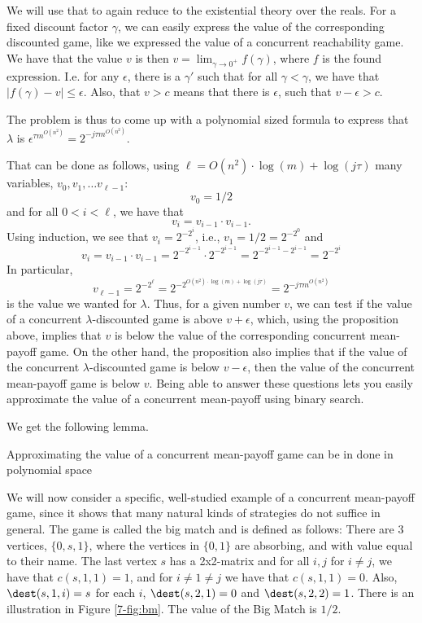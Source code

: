 We will use that to again reduce to the existential theory over the reals. 
For a fixed discount factor $\gamma$, we can easily express the value of the corresponding discounted game, like we expressed the value of a concurrent reachability game.
We have that the value $v$ is then $v=\lim_{\gamma\rightarrow 0^+} f(\gamma)$, where $f$ is the found expression.
I.e. for any $\epsilon$, there is a $\gamma'$ such that for all $\gamma<\gamma$, we have that $|f(\gamma)-v|\leq \epsilon$.
Also, that $v>c$ means that there is $\epsilon$, such that $v-\epsilon>c$.

The problem is thus to come up with a polynomial sized formula to express that $\lambda$ is $\epsilon^{\tau m^{O(n^2)}}=2^{-j \tau m^{O(n^2)}}$.

That can be done as follows, using $\ell=O(n^2)\cdot \log(m)+\log(j\tau)$ many variables, $v_0,v_1,\dots v_{\ell-1}$:
\[
v_0=1/2
\]
and for all $0<i< \ell$, we have that
\[
v_i=v_{i-1}\cdot v_{i-1}.
\]
Using induction, we see that $v_i=2^{-2^{i}}$, i.e., $v_1=1/2=2^{-2^0}$ and \[
v_i=v_{i-1}\cdot v_{i-1}=2^{-2^{i-1}}\cdot 2^{-2^{i-1}}=2^{-2^{i-1}-2^{i-1}}=2^{-2^{i}}\]
In particular, \[
v_{\ell-1}=2^{-2^{\ell}}=2^{-2^{O(n^2)\cdot \log(m)+\log(j\tau)}}=2^{-j\tau m^{O(n^2)}}
\] is the value we wanted for $\lambda$.
Thus, for a given number $v$, we can test if the value of a concurrent  $\lambda$-discounted game is above $v+\epsilon$, which, using the proposition above, implies that $v$ is below the value of the corresponding concurrent mean-payoff game. On the other hand, the proposition also implies that if the value of the concurrent  $\lambda$-discounted game is below $v-\epsilon$, then the value of the concurrent mean-payoff game is below $v$. Being able to answer these questions lets you easily approximate the value of a concurrent mean-payoff using binary search. 

We get the following lemma.
\begin{lemma}
Approximating the value of a concurrent mean-payoff game can be in done in polynomial space
\end{lemma}



We will now consider a specific, well-studied example of a concurrent mean-payoff game, since it shows that many natural kinds of strategies do not suffice in general.
The game is called the big match and is defined as follows:
There are 3 vertices, $\{0,s,1\}$, where the vertices in $\{0,1\}$ are absorbing, and with value equal to their name.
The last vertex $s$ has a 2x2-matrix and for all $i,j$ for $i\neq j$, we have that 
$c(s,1,1)=1$, and for $i\neq 1\neq j$ we have that $c(s,1,1)=0$.
Also,  $\dest(s,1,i)=s$ for each $i$, $\dest(s,2,1)=0$ and $\dest(s,2,2)=1$. There is an illustration in Figure \ref{7-fig:bm}.
The value of the Big Match is $1/2$.

